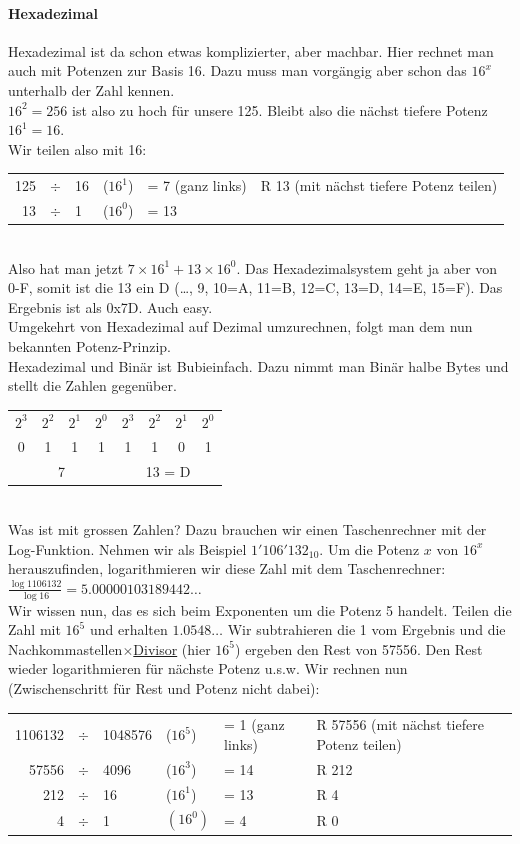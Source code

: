 \pagebreak
\paragraph{Hexadezimal}Hexadezimal ist da schon etwas komplizierter, aber machbar. Hier rechnet man auch mit Potenzen zur Basis 16. Dazu muss man vorgängig aber schon das $16^x$ unterhalb der Zahl kennen.\\
$16^2=256$ ist also zu hoch für unsere 125. Bleibt also die nächst tiefere Potenz  $16^1=16$.\\
Wir teilen also mit 16:\\
\begin{tabular}{rcllll}
    125&$\div$&16&($16^1$)&= 7 (ganz links)&R  13 (mit nächst tiefere Potenz teilen)\\
    13&$\div$&1&($16^0$) &= 13&\\[1em]
\end{tabular}\\
Also hat man jetzt $7\times16^1+13\times16^0$. Das Hexadezimalsystem geht ja aber von 0-F, somit ist die 13 ein D (\dots, 9, 10=A, 11=B, 12=C, 13=D, 14=E, 15=F). Das Ergebnis ist als 0x7D. Auch easy.\\
Umgekehrt von Hexadezimal auf Dezimal umzurechnen, folgt man dem nun bekannten Potenz-Prinzip.\\
Hexadezimal und Binär ist Bubieinfach. Dazu nimmt man Binär halbe Bytes und stellt die Zahlen gegenüber.\\
\begin{tabular}{cccc|cccc}
    $2^3$&$2^2$&$2^1$&$2^0$&$2^3$&$2^2$&$2^1$&$2^0$\\
    0&1&1&1&1&1&0&1\\
    \hline
    \multicolumn{4}{c|}{7}&\multicolumn{4}{c}{13 = D}\\
\end{tabular}\\[1em]

Was ist mit grossen Zahlen? Dazu brauchen wir einen Taschenrechner mit der Log-Funktion. Nehmen wir als Beispiel $1'106'132_{10}$. Um die Potenz $x$ von $16^x$ herauszufinden, logarithmieren wir diese Zahl mit dem Taschenrechner: $\frac{\log{1106132}}{\log{16}}=5.00000103189442\dots$ \\
Wir wissen nun, das es sich beim Exponenten um die Potenz 5 handelt. Teilen die Zahl mit $16^5$ und erhalten $1.0548\dots$ Wir subtrahieren die 1 vom Ergebnis und die Nachkommastellen$\times$\underline{Divisor} (hier $16^5$) ergeben den Rest von 57556. Den Rest wieder logarithmieren für nächste Potenz u.s.w. Wir rechnen nun (Zwischenschritt für Rest und Potenz nicht dabei):\\
\begin{tabular}{rcllll}
    1106132&$\div$&1048576&($16^5$)&= 1 (ganz links)&R 57556 (mit nächst tiefere Potenz teilen)\\
    57556&$\div$&4096&($16^3$)&= 14&R 212\\
    212&$\div$&16&($16^1$)&= 13&R 4\\
    4&$\div$&1&$(16^0)$&= 4&R 0\\[1em]
\end{tabular}\\

